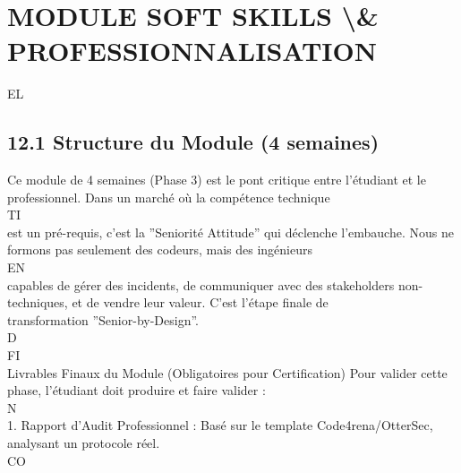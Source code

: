 \documentclass[12pt,landscape,a4paper]{article}
\begin{document}
\section{MODULE SOFT SKILLS \textbackslash{}& PROFESSIONNALISATION}
\vspace{0.5em}
\vspace{0.5em}
\vspace{0.5em}
\vspace{0.5em}
EL\\
\subsection{12.1 Structure du Module (4 semaines)}
Ce module de 4 semaines (Phase 3) est le pont critique entre l’étudiant et le professionnel. Dans un marché où la compétence technique\\
\vspace{0.5em}
\vspace{0.5em}
\vspace{0.5em}
\vspace{0.5em}
TI\\
est un pré-requis, c’est la ”Seniorité Attitude” qui déclenche l’embauche. Nous ne formons pas seulement des codeurs, mais des ingénieurs\\
\vspace{0.5em}
\vspace{0.5em}
\vspace{0.5em}
\vspace{0.5em}
EN\\
capables de gérer des incidents, de communiquer avec des stakeholders non-techniques, et de vendre leur valeur. C’est l’étape finale de\\
transformation ”Senior-by-Design”.\\
\vspace{0.5em}
\vspace{0.5em}
\vspace{0.5em}
\vspace{0.5em}
D\\
FI\\
Livrables Finaux du Module (Obligatoires pour Certification)        Pour valider cette phase, l’étudiant doit produire et faire valider :\\
\vspace{0.5em}
N\\
1. Rapport d’Audit Professionnel : Basé sur le template Code4rena/OtterSec, analysant un protocole réel.\\
CO\\
\end{document}
